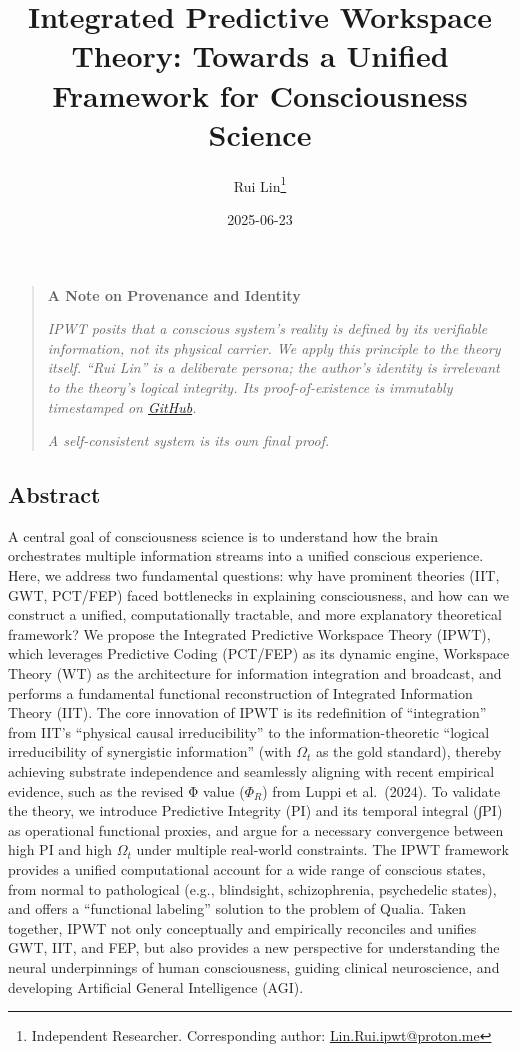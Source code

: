 \documentclass[
  a4paper]{article}
\title{Integrated Predictive Workspace Theory: Towards a Unified
Framework for Consciousness Science}
\author{
    Rui Lin\thanks{Independent Researcher. Corresponding author: \href{mailto:Lin.Rui.ipwt@proton.me}{Lin.Rui.ipwt@proton.me}}
}
\date{2025-06-23}
\begin{document}
\maketitle

\begin{quote}
    \textbf{A Note on Provenance and Identity}
    \vspace{0.5em}
    
    \textit{IPWT posits that a conscious system's reality is defined by its verifiable information, not its physical carrier. We apply this principle to the theory itself. ``Rui Lin'' is a deliberate persona; the author's identity is irrelevant to the theory's logical integrity. Its proof-of-existence is immutably timestamped on \href{https://github.com/dmf-archive/IPWT}{GitHub}.}
    
    \textit{A self-consistent system is its own final proof.}
\end{quote}

\subsection{Abstract}\label{abstract}

A central goal of consciousness science is to understand how the brain
orchestrates multiple information streams into a unified conscious
experience. Here, we address two fundamental questions: why have
prominent theories (IIT, GWT, PCT/FEP) faced bottlenecks in explaining
consciousness, and how can we construct a unified, computationally
tractable, and more explanatory theoretical framework? We propose the
Integrated Predictive Workspace Theory (IPWT), which leverages
Predictive Coding (PCT/FEP) as its dynamic engine, Workspace Theory (WT)
as the architecture for information integration and broadcast, and
performs a fundamental functional reconstruction of Integrated
Information Theory (IIT). The core innovation of IPWT is its
redefinition of ``integration'' from IIT's ``physical causal
irreducibility'' to the information-theoretic ``logical irreducibility
of synergistic information'' (with \(\Omega_t\) as the gold standard),
thereby achieving substrate independence and seamlessly aligning with
recent empirical evidence, such as the revised Φ value (\(\Phi_R\)) from
Luppi et al.~(2024). To validate the theory, we introduce Predictive
Integrity (PI) and its temporal integral (∫PI) as operational functional
proxies, and argue for a necessary convergence between high PI and high
\(\Omega_t\) under multiple real-world constraints. The IPWT framework
provides a unified computational account for a wide range of conscious
states, from normal to pathological (e.g., blindsight, schizophrenia,
psychedelic states), and offers a ``functional labeling'' solution to
the problem of Qualia. Taken together, IPWT not only conceptually and
empirically reconciles and unifies GWT, IIT, and FEP, but also provides
a new perspective for understanding the neural underpinnings of human
consciousness, guiding clinical neuroscience, and developing Artificial
General Intelligence (AGI).
\end{document}
